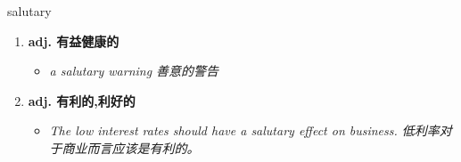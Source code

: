 
\begin{frame}
{\huge salutary}
\begin{center}
\begin{enumerate}\Large
  \item \textbf{adj. 有益健康的}
  \begin{itemize}
    \item \em{\Large{a salutary warning 善意的警告}}
  \end{itemize}
  \item \textbf{adj. 有利的,利好的}
  \begin{itemize}
    \item \em{\Large{The low interest rates should have a salutary effect on business. 低利率对于商业而言应该是有利的。}}
  \end{itemize}
\end{enumerate}
\end{center}
\end{frame}
